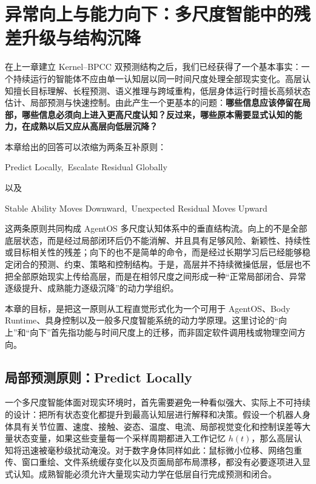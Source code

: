 \chapter{异常向上与能力向下：多尺度智能中的残差升级与结构沉降}
\label{chap:residual-escalation-and-capability-downward}

\begin{chapterlead}
在上一章建立 Kernel--BPCC 双预测结构之后，我们已经获得了一个基本事实：一个持续运行的智能体不应由单一认知层以同一时间尺度处理全部现实变化。高层认知擅长目标理解、长程预测、语义推理与跨域重构，低层身体运行时擅长高频状态估计、局部预测与快速控制。由此产生一个更基本的问题：\textbf{哪些信息应该停留在局部，哪些信息必须向上进入更高尺度认知？反过来，哪些原本需要显式认知的能力，在成熟以后又应从高层向低层沉降？}

本章给出的回答可以浓缩为两条互补原则：
\begin{statementbox}
Predict Locally,\ Escalate Residual Globally
\end{statementbox}
以及
\begin{statementbox}
Stable Ability Moves Downward,\ Unexpected Residual Moves Upward
\end{statementbox}

这两条原则共同构成 AgentOS 多尺度认知体系中的垂直结构流。向上的不是全部底层状态，而是经过局部闭环后仍不能消解、并且具有足够风险、新颖性、持续性或目标相关性的残差；向下的也不是简单的命令，而是经过长期学习后已经能够稳定闭合的预测、约束、策略和控制结构。于是，高层并不持续微操低层，低层也不把全部原始现实上传给高层，而是在相邻尺度之间形成一种``正常局部闭合、异常逐级提升、成熟能力逐级沉降''的动力学组织。

本章的目标，是把这一原则从工程直觉形式化为一个可用于 AgentOS、Body Runtime、具身控制以及一般多尺度智能系统的动力学原理。这里讨论的``向上''和``向下''首先指功能与时间尺度上的迁移，而非固定软件调用栈或物理空间方向。
\end{chapterlead}

\section{局部预测原则：Predict Locally}

一个多尺度智能体面对现实环境时，首先需要避免一种看似强大、实际上不可持续的设计：把所有状态变化都提升到最高认知层进行解释和决策。假设一个机器人身体具有关节位置、速度、接触、姿态、温度、电流、局部视觉变化和控制误差等大量状态变量，如果这些变量每一个采样周期都进入工作记忆 $h(t)$，那么高层认知将迅速被毫秒级扰动淹没。对于数字身体同样如此：鼠标微小位移、网络包重传、窗口重绘、文件系统缓存变化以及页面局部布局漂移，都没有必要逐项进入显式认知。成熟智能必须允许大量现实动力学在低层自行完成预测和闭合。

